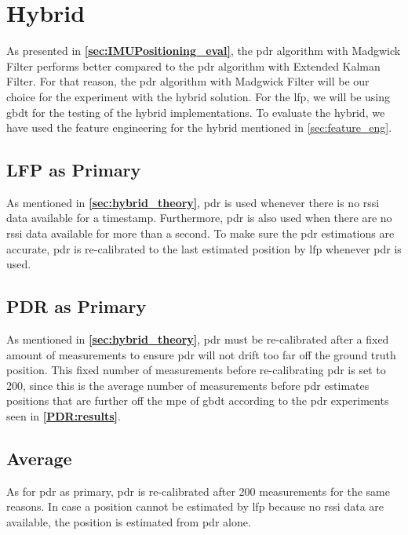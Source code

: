\section{Hybrid}
As presented in \textbf{\autoref{sec:IMUPositioning_eval}}, the \gls{pdr} algorithm with Madgwick Filter performs better compared to the \gls{pdr} algorithm with Extended Kalman Filter. For that reason, the \gls{pdr} algorithm with Madgwick Filter will be our choice for the experiment with the hybrid solution. For the \gls{lfp}, we will be using \gls{gbdt} for the testing of the hybrid implementations.
To evaluate the hybrid, we have used the feature engineering for the hybrid mentioned in \autoref{sec:feature_eng}.

\subsection*{LFP as Primary}
As mentioned in \textbf{\autoref{sec:hybrid_theory}}, \gls{pdr} is used whenever there is no \gls{rssi} data available for a timestamp. Furthermore, \gls{pdr} is also used when there are no \gls{rssi} data available for more than a second. To make sure the \gls{pdr} estimations are accurate, \gls{pdr} is re-calibrated to the last estimated position by \gls{lfp} whenever \gls{pdr} is used.

\subsection*{PDR as Primary}
As mentioned in \textbf{\autoref{sec:hybrid_theory}}, \gls{pdr} must be re-calibrated after a fixed amount of measurements to ensure \gls{pdr} will not drift too far off the ground truth position. This fixed number of measurements before re-calibrating \gls{pdr} is set to 200, since this is the average number of measurements before \gls{pdr} estimates positions that are further off the \gls{mpe} of \gls{gbdt} according to the \gls{pdr} experiments seen in \textbf{\autoref{PDR:results}}.

\subsection*{Average}
As for \gls{pdr} as primary, \gls{pdr} is re-calibrated after 200 measurements for the same reasons. In case a position cannot be estimated by \gls{lfp} because no \gls{rssi} data are available, the position is estimated from \gls{pdr} alone.
